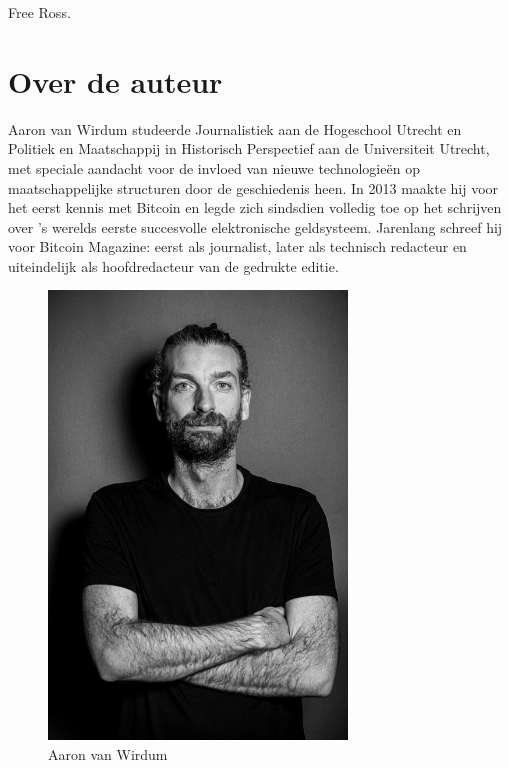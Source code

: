 \documentclass[
  a5paper,
  smalldemyvopaper,11pt,twoside,onecolumn,openright,extrafontsizes,
hidelinks]{memoir}
\begin{document}
Free Ross.


\chapter*{Over de auteur}\label{over-de-auteur}


Aaron van Wirdum studeerde Journalistiek aan de Hogeschool Utrecht en
Politiek en Maatschappij in Historisch Perspectief aan de Universiteit
Utrecht, met speciale aandacht voor de invloed van nieuwe technologieën
op maatschappelijke structuren door de geschiedenis heen. In 2013 maakte
hij voor het eerst kennis met Bitcoin en legde zich sindsdien volledig
toe op het schrijven over 's werelds eerste succesvolle elektronische
geldsysteem. Jarenlang schreef hij voor Bitcoin Magazine: eerst als
journalist, later als technisch redacteur en uiteindelijk als
hoofdredacteur van de gedrukte editie.

\begin{figure}[H]

{\centering \includegraphics[width=3.125in,height=\textheight]{hoofdstuk/../figures/aaron-van-wirdum.jpg}

}

\caption{Aaron van Wirdum}

\end{figure}%
\end{document}
